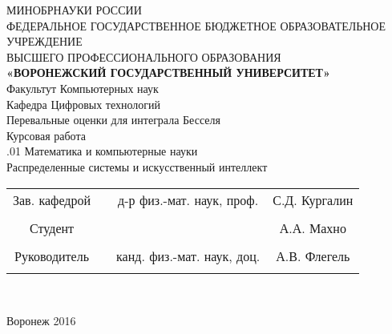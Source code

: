 \documentclass[14pt]{extarticle}
\begin{document}
\begin{center}
	\hfill \break
	\large{МИНОБРНАУКИ РОССИИ}\\
	\footnotesize{ФЕДЕРАЛЬНОЕ ГОСУДАРСТВЕННОЕ БЮДЖЕТНОЕ ОБРАЗОВАТЕЛЬНОЕ УЧРЕЖДЕНИЕ}\\
	\footnotesize{ВЫСШЕГО ПРОФЕССИОНАЛЬНОГО ОБРАЗОВАНИЯ}\\
	\small{\textbf{«ВОРОНЕЖСКИЙ ГОСУДАРСТВЕННЫЙ УНИВЕРСИТЕТ»}}\\
	\hfill \break
	\normalsize{Факультут Компьютерных наук}\\
	\hfill \break
	\normalsize{Кафедра Цифровых технологий}\\
	\hfill\break
	\hfill \break
	\hfill \break
	\hfill \break
	\large{Перевальные оценки для интеграла Бесселя}\\
	\hfill \break
	\hfill \break
	\hfill \break
	\normalsize{Курсовая работа\\
		\hfill {}.01 Математика и компьютерные науки\\
		\hfill \break
		Распределенные системы и искусственный интеллект}\\
	\hfill \break
	\hfill \break
\end{center}

\hfill \break
\hfill \break

\normalsize{
	\begin{tabular}{cccc}
		Зав. кафедрой & \underline{\hspace{3cm}} &  д-р физ.-мат. наук,  проф. & С.Д. Кургалин \\\\
		Студент & \underline{\hspace{3cm}} & &А.А. Махно \\\\
		Руководитель & \underline{\hspace{3cm}}& канд. физ.-мат. наук, доц. &  А.В. Флегель \\\\
	\end{tabular}
}\\
\hfill \break
\hfill \break
\begin{center} Воронеж 2016 \end{center}
\thispagestyle{empty} %

\newpage	
\tableofcontents
\thispagestyle{empty} %
\newpage	
\end{document}
